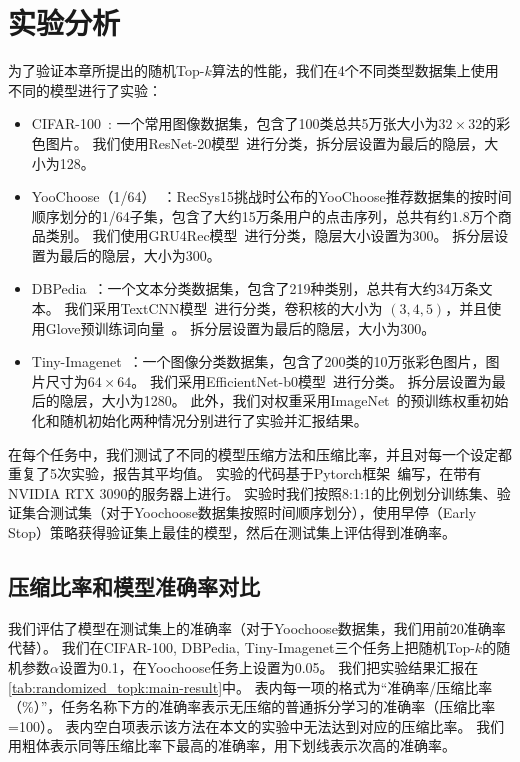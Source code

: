 \section{实验分析}

为了验证本章所提出的随机Top-$k$算法的性能，我们在4个不同类型数据集上使用不同的模型进行了实验：
\begin{itemize}
    \item CIFAR-100~\cite{krizhevsky_2009_cifar}: 一个常用图像数据集，包含了100类总共5万张大小为$32\times 32$的彩色图片。
        我们使用ResNet-20模型~\cite{hekaiming2016resnet}进行分类，拆分层设置为最后的隐层，大小为128。
    \item YooChoose（1/64）~\cite{ben2015yoochoose,lijing_2017_narm}：RecSys15挑战时公布的YooChoose推荐数据集的按时间顺序划分的1/64子集，包含了大约15万条用户的点击序列，总共有约1.8万个商品类别。
        我们使用GRU4Rec模型~\cite{hidasi_2016_gru4rec}进行分类，隐层大小设置为300。
        拆分层设置为最后的隐层，大小为300。
    \item DBPedia~\cite{2007dbpedia}：一个文本分类数据集，包含了219种类别，总共有大约34万条文本。
        我们采用TextCNN模型~\cite{kimyoon2014textcnn}进行分类，卷积核的大小为 $(3,4,5)$，并且使用Glove预训练词向量~\cite{pennington2014glove}。
        拆分层设置为最后的隐层，大小为300。
    \item Tiny-Imagenet~\cite{tiny-imagenet}：一个图像分类数据集，包含了200类的10万张彩色图片，图片尺寸为$64\times 64$。
        我们采用EfficientNet-b0模型~\cite{tanmingxing2019efficientnet}进行分类。
        拆分层设置为最后的隐层，大小为1280。
        此外，我们对权重采用ImageNet~\cite{2009_imagenet}的预训练权重初始化和随机初始化两种情况分别进行了实验并汇报结果。
\end{itemize}

在每个任务中，我们测试了不同的模型压缩方法和压缩比率，并且对每一个设定都重复了5次实验，报告其平均值。
%
实验的代码基于Pytorch框架~\cite{2019_pytorch}编写，在带有NVIDIA RTX 3090的服务器上进行。
%
实验时我们按照8:1:1的比例划分训练集、验证集合测试集（对于Yoochoose数据集按照时间顺序划分），使用早停（Early Stop）策略获得验证集上最佳的模型，然后在测试集上评估得到准确率。



\subsection{压缩比率和模型准确率对比}
%
我们评估了模型在测试集上的准确率（对于Yoochoose数据集，我们用前20准确率代替）。
%
我们在CIFAR-100, DBPedia, Tiny-Imagenet三个任务上把随机Top-$k$的随机参数$\alpha$设置为0.1，在Yoochoose任务上设置为0.05。
%
我们把实验结果汇报在\autoref{tab:randomized_topk:main-result}中。
表内每一项的格式为“准确率/压缩比率（\%）”，任务名称下方的准确率表示无压缩的普通拆分学习的准确率（压缩比率=100）。
表内空白项表示该方法在本文的实验中无法达到对应的压缩比率。
我们用粗体表示同等压缩比率下最高的准确率，用下划线表示次高的准确率。


